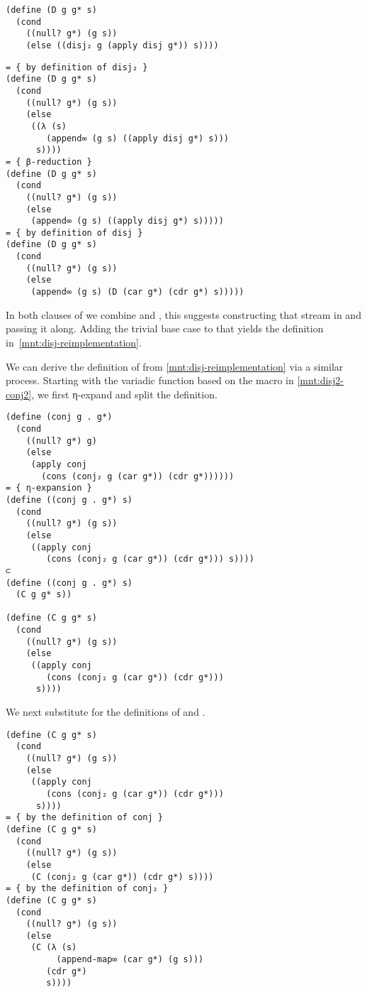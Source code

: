 \documentclass[sigplan,balance=true,pbalance=true,natbib=false]{acmart}
\begin{document}
\begin{verbatim}
(define (D g g* s)
  (cond
    ((null? g*) (g s))
    (else ((disj₂ g (apply disj g*)) s))))
\end{verbatim}

\begin{verbatim}
= { by definition of disj₂ }
(define (D g g* s)
  (cond
    ((null? g*) (g s))
    (else
     ((λ (s)
        (append∞ (g s) ((apply disj g*) s)))
      s))))
= { β-reduction }
(define (D g g* s)
  (cond
    ((null? g*) (g s))
    (else
     (append∞ (g s) ((apply disj g*) s)))))
= { by definition of disj }
(define (D g g* s)
  (cond
    ((null? g*) (g s))
    (else
     (append∞ (g s) (D (car g*) (cdr g*) s)))))
\end{verbatim}

In both clauses of  we combine  and
, this suggests constructing that stream in
 and passing it along. Adding the trivial base case
to that  yields the definition
in~\cref{mnt:disj-reimplementation}.

We can derive the definition of  from
\cref{mnt:disj-reimplementation} via a similar process. Starting with
the variadic function based on the macro in \cref{mnt:disj2-conj2}, we
first η-expand and split the definition.

\begin{verbatim}
(define (conj g . g*)
  (cond
    ((null? g*) g)
    (else
     (apply conj
       (cons (conj₂ g (car g*)) (cdr g*))))))
= { η-expansion }
(define ((conj g . g*) s)
  (cond
    ((null? g*) (g s))
    (else
     ((apply conj
        (cons (conj₂ g (car g*)) (cdr g*))) s))))
⊂
(define ((conj g . g*) s)
  (C g g* s))

(define (C g g* s)
  (cond
    ((null? g*) (g s))
    (else
     ((apply conj
        (cons (conj₂ g (car g*)) (cdr g*)))
      s))))
\end{verbatim}

\noindent We next substitute for the definitions of 
and .

\begin{verbatim}
(define (C g g* s)
  (cond
    ((null? g*) (g s))
    (else
     ((apply conj
        (cons (conj₂ g (car g*)) (cdr g*)))
      s))))
= { by the definition of conj }
(define (C g g* s)
  (cond
    ((null? g*) (g s))
    (else
     (C (conj₂ g (car g*)) (cdr g*) s))))
= { by the definition of conj₂ }
(define (C g g* s)
  (cond
    ((null? g*) (g s))
    (else
     (C (λ (s)
          (append-map∞ (car g*) (g s)))
        (cdr g*)
        s))))
\end{verbatim}
\end{document}

